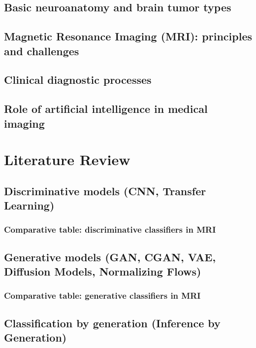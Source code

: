 \section{Basic neuroanatomy and brain tumor types}
\section{Magnetic Resonance Imaging (MRI): principles and challenges}
\section{Clinical diagnostic processes}
\section{Role of artificial intelligence in medical imaging}

	



\chapter{Literature Review}

\section{Discriminative models (CNN, Transfer Learning)}

\subsection{Comparative table: discriminative classifiers in MRI}

\section{Generative models (GAN, CGAN, VAE, Diffusion Models, Normalizing Flows)}

\subsection{Comparative table: generative classifiers in MRI
}
\section{Classification by generation (Inference by Generation)}

